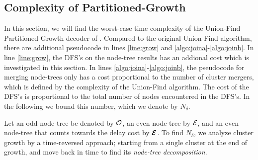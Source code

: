 
\subsection{Complexity of Partitioned-Growth}\label{sec:complexity}

In this section, we will find the worst-case time complexity of the Union-Find Partitioned-Growth decoder of . Compared to the original Union-Find algorithm, there are additional pseudocode in lines \ref{line:grow} and \ref{algo:joina}-\ref{algo:joinb}. In line \ref{line:grow}, the DFS's on the node-tree results has an addional cost which is investigated in this section. In lines \ref{algo:joina}-\ref{algo:joinb}, the pseudocode for merging node-trees only has a cost proportional to the number of cluster mergers, which is defined by the complexity of the Union-Find algorithm. 
The cost of the DFS's is proportional to the total number of nodes encountered in the DFS's. In the following we bound this number, which we denote by $N_\delta$. 

Let an odd node-tree be denoted by $\mathcal{O}$, an even node-tree by $\mathcal{E}$, and an even node-tree that counts towards the delay cost by $\bm{\mathcal{E}}$. To find $N_\delta$, we analyze cluster growth by a time-reversed approach; starting from a single cluster at the end of growth, and move back in time to find its \emph{node-tree decomposition}.


